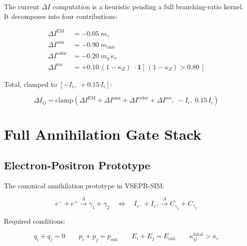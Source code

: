 \documentclass[11pt,a4paper]{article}
\theoremstyle{defbox}
\begin{document}
The current $\Delta I$ computation is a heuristic pending a full
branching-ratio kernel.  It decomposes into four contributions:

\begin{align}
  \Delta I^{\mathrm{EM}}    &= -0.05\; m_\gamma
	\tag{small EM loss} \\[2pt]
  \Delta I^{\mathrm{ann}}   &= -0.90\; m_{\mathrm{ann}}
	\tag{near-total annihilation loss} \\[2pt]
  \Delta I^{\mathrm{color}} &= -0.20\; m_g\,\kappa_c
	\tag{color exchange loss} \\[2pt]
  \Delta I^{\mathrm{res}}   &= +0.10\,(1 - \kappa_Z)\;
							   \cdot\mathbf{1}[\,(1-\kappa_Z) > 0.80\,]
	\tag{resonance / alignment gain}
\end{align}

Total, clamped to $[-I_i,\; +0.15\,I_i]$:

\begin{equation}
  \Delta I_{ij}
  = \mathrm{clamp}\!\left(
	  \Delta I^{\mathrm{EM}}
	+ \Delta I^{\mathrm{ann}}
	+ \Delta I^{\mathrm{color}}
	+ \Delta I^{\mathrm{res}},\;
	-I_i,\;
	0.15\,I_i
	\right)
\end{equation}

\section{Full Annihilation Gate Stack}
\label{sec:annihilation}

\subsection{Electron-Positron Prototype}

The canonical annihilation prototype in VSEPR-SIM:

\begin{equation}
  e^- + e^+ \xrightarrow{A} \gamma_1 + \gamma_2
  \quad\Longleftrightarrow\quad
  I_{e^-} + I_{e^+} \xrightarrow{A} C_{\gamma_1} + C_{\gamma_2}
\end{equation}

Required conditions:

\begin{equation}
  q_i + q_j = 0
  \qquad
  p_i + p_j = p_{\mathrm{out}}
  \qquad
  E_i + E_j = E_{\mathrm{out}}
  \qquad
  \kappa_{ij}^{\mathrm{total}} > \kappa_c
\end{equation}
\end{document}
